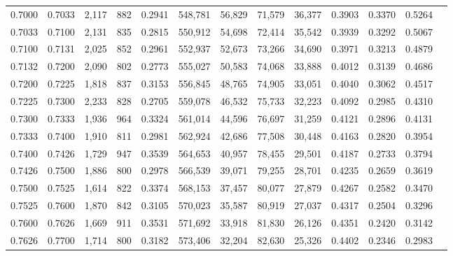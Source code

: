 \begin{tabular}{rrrrrrrrrrrrr}
0.7000 & 0.7033 &  2,117 &   882 &                                     0.2941 & 548,781 &  56,829 &  71,579 &  36,377 & 0.3903 & 0.3370 & 0.5264 \\
0.7033 & 0.7100 &  2,131 &   835 &                                     0.2815 & 550,912 &  54,698 &  72,414 &  35,542 & 0.3939 & 0.3292 & 0.5067 \\
0.7100 & 0.7131 &  2,025 &   852 &                                     0.2961 & 552,937 &  52,673 &  73,266 &  34,690 & 0.3971 & 0.3213 & 0.4879 \\
0.7132 & 0.7200 &  2,090 &   802 &                                     0.2773 & 555,027 &  50,583 &  74,068 &  33,888 & 0.4012 & 0.3139 & 0.4686 \\
0.7200 & 0.7225 &  1,818 &   837 &                                     0.3153 & 556,845 &  48,765 &  74,905 &  33,051 & 0.4040 & 0.3062 & 0.4517 \\
0.7225 & 0.7300 &  2,233 &   828 &                                     0.2705 & 559,078 &  46,532 &  75,733 &  32,223 & 0.4092 & 0.2985 & 0.4310 \\
0.7300 & 0.7333 &  1,936 &   964 &                                     0.3324 & 561,014 &  44,596 &  76,697 &  31,259 & 0.4121 & 0.2896 & 0.4131 \\
0.7333 & 0.7400 &  1,910 &   811 &                                     0.2981 & 562,924 &  42,686 &  77,508 &  30,448 & 0.4163 & 0.2820 & 0.3954 \\
0.7400 & 0.7426 &  1,729 &   947 &                                     0.3539 & 564,653 &  40,957 &  78,455 &  29,501 & 0.4187 & 0.2733 & 0.3794 \\
0.7426 & 0.7500 &  1,886 &   800 &                                     0.2978 & 566,539 &  39,071 &  79,255 &  28,701 & 0.4235 & 0.2659 & 0.3619 \\
0.7500 & 0.7525 &  1,614 &   822 &                                     0.3374 & 568,153 &  37,457 &  80,077 &  27,879 & 0.4267 & 0.2582 & 0.3470 \\
0.7525 & 0.7600 &  1,870 &   842 &                                     0.3105 & 570,023 &  35,587 &  80,919 &  27,037 & 0.4317 & 0.2504 & 0.3296 \\
0.7600 & 0.7626 &  1,669 &   911 &                                     0.3531 & 571,692 &  33,918 &  81,830 &  26,126 & 0.4351 & 0.2420 & 0.3142 \\
0.7626 & 0.7700 &  1,714 &   800 &                                     0.3182 & 573,406 &  32,204 &  82,630 &  25,326 & 0.4402 & 0.2346 & 0.2983 \\

\end{tabular}
